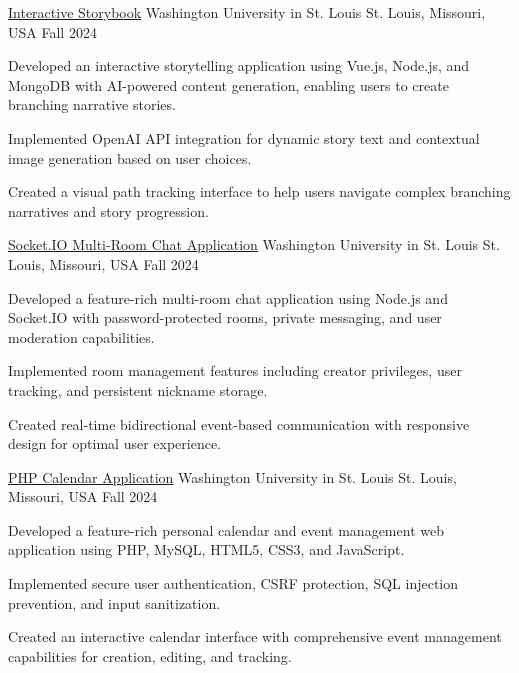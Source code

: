 \documentclass[10pt, letterpaper]{article}
\begin{document}
\begin{projectentry}
  {\href{https://github.com/agopalareddy/CSE503S_Interactive_Storybook}{Interactive Storybook}} %
  {Washington University in St. Louis} %
  {St. Louis, Missouri, USA} %
  {Fall 2024} %
  \item Developed an interactive storytelling application using Vue.js, Node.js, and MongoDB with AI-powered content generation, enabling users to create branching narrative stories.
  \item Implemented OpenAI API integration for dynamic story text and contextual image generation based on user choices.
  \item Created a visual path tracking interface to help users navigate complex branching narratives and story progression.
\end{projectentry}

\begin{projectentry}
  {\href{https://github.com/agopalareddy/CSE503S_Chat_App}{Socket.IO Multi-Room Chat Application}} %
  {Washington University in St. Louis} %
  {St. Louis, Missouri, USA} %
  {Fall 2024} %
  \item Developed a feature-rich multi-room chat application using Node.js and Socket.IO with password-protected rooms, private messaging, and user moderation capabilities.
  \item Implemented room management features including creator privileges, user tracking, and persistent nickname storage.
  \item Created real-time bidirectional event-based communication with responsive design for optimal user experience.
\end{projectentry}

\begin{projectentry}
  {\href{https://github.com/agopalareddy/CSE503S_PHP_Calendar_App}{PHP Calendar Application}} %
  {Washington University in St. Louis} %
  {St. Louis, Missouri, USA} %
  {Fall 2024} %
  \item Developed a feature-rich personal calendar and event management web application using PHP, MySQL, HTML5, CSS3, and JavaScript.
  \item Implemented secure user authentication, CSRF protection, SQL injection prevention, and input sanitization.
  \item Created an interactive calendar interface with comprehensive event management capabilities for creation, editing, and tracking.
\end{projectentry}
\end{document}
